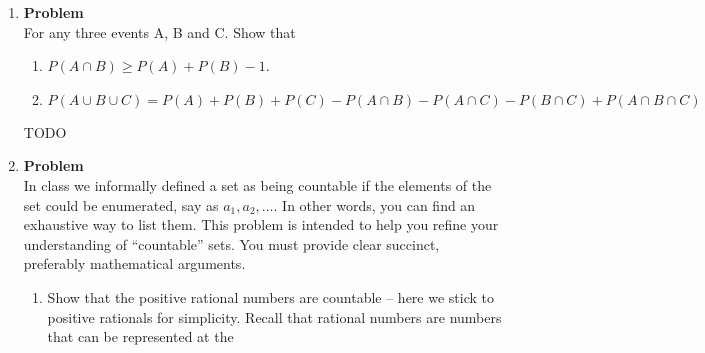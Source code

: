 \documentclass[12pt]{article}
\newenvironment{Ex}{\textbf{Problem}\vspace{.75em}\\}{}
\begin{document}
\begin{enumerate}
\begin{Ex}
\begin{solution}
\begin{enumerate}
        From this information we can obtain $A^c = \{1,2,4,5\}$ and
        $B^c=\{4,6\}$.

        And now we can insert the sets into the equation:
        \begin{equation*}
          \begin{aligned}
            A &= (A^c \cup B^c)^c \cup (A^c \cup B)^c \\
            &= (\{1,2,4,5\} \cup \{4,6\})^c \cup (\{1,2,4,5\}
            \cup \{1,2,3,5\})^c \\
            &= (\{1,2,4,5,6\})^c \cup (\{1,2,3,4,5\})^c \\
            &= \{3\} \cup \{6\} \\
            \{3, 6\} &= \{3, 6\}
          \end{aligned}
        \end{equation*}
        The probabilities for both sides have been determined to be
        equivalent ($\frac{1}{3}$).
      \end{enumerate}
    \end{solution}
  \end{Ex}
\item
  \begin{Ex} For any three events A, B and C. Show that
    \begin{enumerate}
    \item $P(A \cap B) \ge P(A)+P(B) - 1$.
    \item $P(A \cup B \cup C) = P(A) + P(B) + P(C) - P(A \cap B) - P(A
      \cap C)−P(B \cap C) + P(A \cap B \cap C)$
    \end{enumerate}
    \begin{solution} \hfill
      {\huge TODO}
    \end{solution}
  \end{Ex}
\item 
  \begin{Ex}
    In class we informally defined a set as being countable if the
    elements of the set could be enumerated, say as
    $a_1,a_2,\ldots$. In other words, you can find an exhaustive way
    to list them. This problem is intended to help you refine your
    understanding of ``countable'' sets. You must provide clear
    succinct, preferably mathematical arguments.
    \begin{enumerate}
    \item Show that the positive rational numbers are countable – here
      we stick to positive rationals for simplicity. Recall that
      rational numbers are numbers that can be represented at the

\end{enumerate}
\end{Ex}
\end{enumerate}
\end{document}
